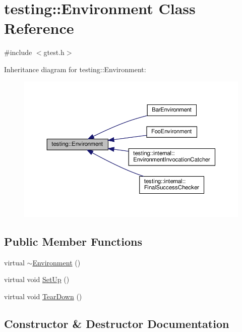 \hypertarget{classtesting_1_1_environment}{}\section{testing\+:\+:Environment Class Reference}
\label{classtesting_1_1_environment}


{\ttfamily \#include $<$gtest.\+h$>$}



Inheritance diagram for testing\+:\+:Environment\+:
\nopagebreak
\begin{figure}[H]
\begin{center}
\leavevmode
\includegraphics[width=350pt]{classtesting_1_1_environment__inherit__graph}
\end{center}
\end{figure}
\subsection*{Public Member Functions}
\begin{DoxyCompactItemize}
\item 
virtual \hyperlink{classtesting_1_1_environment_a0e41c320362576d752cd1f44cabd57d4}{$\sim$\+Environment} ()
\item 
virtual void \hyperlink{classtesting_1_1_environment_a1bf8cafaa9d4eba9feb98655ee434eb3}{Set\+Up} ()
\item 
virtual void \hyperlink{classtesting_1_1_environment_a039bdaa705c46b9b88234cf4d3bb6254}{Tear\+Down} ()
\end{DoxyCompactItemize}


\subsection{Constructor \& Destructor Documentation}
\mbox{\label{classtesting_1_1_environment_a0e41c320362576d752cd1f44cabd57d4}} 
